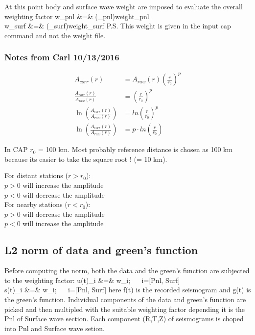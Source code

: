 \documentclass[11pt,titlepage,fleqn]{article}
\begin{document}
At this point body and surface wave weight are imposed to evaluate the overall weighting factor
\eqa
w_{pnl}  &=& (\mu_{pnl})\times weight_{pnl}\\
w_{surf} &=& (\mu_{surf})\times weight_{surf}
\ena
P.S. This weight is given in the input cap command and not the weight file.

\subsubsection*{Notes from Carl 10/13/2016}
\begin{align*}
A_{corr}(r) &= A_{raw}(r) \left( \frac{r}{r_0} \right)^p \\
\frac{A_{corr}(r)}{A_{raw}(r)} &= \left( \frac{r}{r_0} \right)^p \\
\ln \left(\frac{A_{corr}(r)}{A_{raw}(r)} \right) &= ln \left( \frac{r}{r_0} \right)^p \\
\ln \left(\frac{A_{corr}(r)}{A_{raw}(r)} \right) &= p \cdot ln \left( \frac{r}{r_0} \right)
\end{align*}

In CAP $r_0$ = 100 km. Most probably reference distance is chosen as 100 km because its easier to take the square root ! (= 10 km).

For distant stations ($r > r_0$):\\
$p > 0$ will increase the amplitude\\
$p < 0$ will decrease the amplitude\\
For nearby stations ($r < r_0$):\\
$p > 0$ will decrease the amplitude\\
$p < 0$ will increase the amplitude\\

\subsection{L2 norm of data and green's function}
Before computing the norm, both the data and the green's function are subjected to the weighting factor:
\eqa
u(t)_i &=& w_i\times[f(t)_i];\,\,\,\,\,\,\,\,\,\,i=[Pnl, Surf]\\
s(t)_i &=& w_i\times[g(t)_i];\,\,\,\,\,\,\,\,\,\,i=[Pnl, Surf]
\ena
here f(t) is the recorded seismogram and g(t) is the green's function. Individual components of the data and green's function are picked and then multipled with the suitable weighting factor depending it is the Pnl of Surface wave section. Each component (R,T,Z) of seismograms is choped into Pnl and Surface wave setion.
\end{document}
